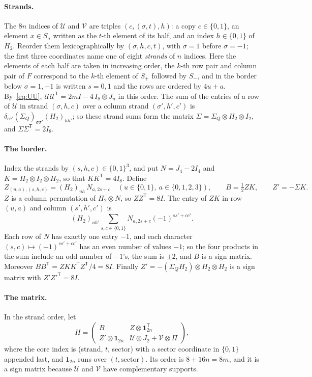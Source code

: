 \documentclass[10pt]{article}
\theoremstyle{definition}
\theoremstyle{remark}
\newcommand{\tr}{^{\mathsf T}}
\newcommand{\one}{\mathbf 1}
\newcommand{\cU}{\mathcal U}
\newcommand{\cV}{\mathcal V}
\begin{document}
\paragraph{Strands.} The $8n$ indices of $\cU$ and $\cV$ are triples $(c,(\sigma,t),h)$: a copy $c\in\{0,1\}$, an element $x\in S_\sigma$ written as the $t$-th element of its half, and an index $h\in\{0,1\}$ of $H_2$. Reorder them lexicographically by $(\sigma,h,c,t)$, with $\sigma=1$ before $\sigma=-1$; the first three coordinates name one of eight \emph{strands} of $n$ indices. Here the elements of each half are taken in increasing order, the $k$-th row pair and column pair of $F$ correspond to the $k$-th element of $S_+$ followed by $S_-$, and in the border below $\sigma=1,-1$ is written $s=0,1$ and the rows are ordered by $4u+a$. By~\eqref{eq:UU}, $\cU\cU\tr=2mI-4\,I_8\otimes J_n$ in this order. The sum of the entries of a row of $\cU$ in strand $(\sigma,h,c)$ over a column strand $(\sigma',h',c')$ is $\delta_{cc'}(\Sigma_Q)_{\sigma\sigma'}(H_2)_{hh'}$; so these strand sums form the matrix $\Sigma=\Sigma_Q\otimes H_2\otimes I_2$, and $\Sigma\Sigma\tr=2I_8$.

\paragraph{The border.} Index the strands by $(s,h,c)\in\{0,1\}^3$, and put $N=J_4-2I_4$ and $K=H_2\otimes I_2\otimes H_2$, so that $KK\tr=4I_8$. Define
\[
Z_{(u,a),(s,h,c)}=(H_2)_{uh}\,N_{a,2s+c}\quad(u\in\{0,1\},\ a\in\{0,1,2,3\}),\qquad B=\tfrac12ZK,\qquad Z'=-\Sigma K.
\]
$Z$ is a column permutation of $H_2\otimes N$, so $ZZ\tr=8I$. The entry of $ZK$ in row $(u,a)$ and column $(s',h',c')$ is
\[
(H_2)_{uh'}\sum_{s,c\in\{0,1\}}N_{a,2s+c}(-1)^{ss'+cc'}.
\] Each row of $N$ has exactly one entry $-1$, and each character $(s,c)\mapsto(-1)^{ss'+cc'}$ has an even number of values $-1$; so the four products in the sum include an odd number of $-1$'s, the sum is $\pm2$, and $B$ is a sign matrix. Moreover $BB\tr=ZKK\tr Z\tr/4=8I$. Finally $Z'=-(\Sigma_QH_2)\otimes H_2\otimes H_2$ is a sign matrix with $Z'Z'^{\mathsf T}=8I$.

\paragraph{The matrix.} In the strand order, let
\[
H=\begin{pmatrix}B&Z\otimes\one_{2n}\tr\\ Z'\otimes\one_{2n}&\cU\otimes J_2+\cV\otimes \Pi\end{pmatrix},
\]
where the core index is (strand, $t$, sector) with a sector coordinate in $\{0,1\}$ appended last, and $\one_{2n}$ runs over $(t,\text{sector})$. Its order is $8+16n=8m$, and it is a sign matrix because $\cU$ and $\cV$ have complementary supports.
\end{document}
